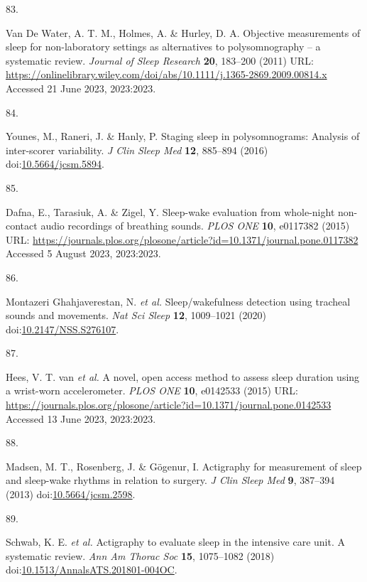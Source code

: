 \documentclass[
  9pt,
]{scrbook}
\newlength{\cslhangindent}
\newlength{\csllabelwidth}
\newlength{\cslentryspacingunit} %
\newenvironment{CSLReferences}[2] %
 {%
  \setlength{\parindent}{0pt}
  \ifodd #1
  \let\oldpar\par
  \def\par{\hangindent=\cslhangindent\oldpar}
  \fi
  \setlength{\parskip}{#2\cslentryspacingunit}
 }%
 {}
\newcommand{\CSLLeftMargin}[1]{\parbox[t]{\csllabelwidth}{#1}}
\newcommand{\CSLRightInline}[1]{\parbox[t]{\linewidth - \csllabelwidth}{#1}\break}
\begin{document}
\begin{CSLReferences}{0}{0}
\leavevmode{}%
\CSLLeftMargin{83. }%
\CSLRightInline{Van De Water, A. T. M., Holmes, A. \& Hurley, D. A.
Objective measurements of sleep for non-laboratory settings as
alternatives to polysomnography -- a systematic review. \emph{Journal of
Sleep Research} \textbf{20}, 183--200 (2011) URL:
\url{https://onlinelibrary.wiley.com/doi/abs/10.1111/j.1365-2869.2009.00814.x}
Accessed 21 June 2023, 2023:2023.}

\leavevmode{}%
\CSLLeftMargin{84. }%
\CSLRightInline{Younes, M., Raneri, J. \& Hanly, P. Staging sleep in
polysomnograms: Analysis of inter-scorer variability. \emph{J Clin Sleep
Med} \textbf{12}, 885--894 (2016)
doi:\href{https://doi.org/10.5664/jcsm.5894}{10.5664/jcsm.5894}.}

\leavevmode{}%
\CSLLeftMargin{85. }%
\CSLRightInline{Dafna, E., Tarasiuk, A. \& Zigel, Y. Sleep-wake
evaluation from whole-night non-contact audio recordings of breathing
sounds. \emph{{PLOS} {ONE}} \textbf{10}, e0117382 (2015) URL:
\url{https://journals.plos.org/plosone/article?id=10.1371/journal.pone.0117382}
Accessed 5 August 2023, 2023:2023.}

\leavevmode{}%
\CSLLeftMargin{86. }%
\CSLRightInline{Montazeri Ghahjaverestan, N. \emph{et al.}
Sleep/wakefulness detection using tracheal sounds and movements.
\emph{Nat Sci Sleep} \textbf{12}, 1009--1021 (2020)
doi:\href{https://doi.org/10.2147/NSS.S276107}{10.2147/NSS.S276107}.}

\leavevmode{}%
\CSLLeftMargin{87. }%
\CSLRightInline{Hees, V. T. van \emph{et al.} A novel, open access
method to assess sleep duration using a wrist-worn accelerometer.
\emph{{PLOS} {ONE}} \textbf{10}, e0142533 (2015) URL:
\url{https://journals.plos.org/plosone/article?id=10.1371/journal.pone.0142533}
Accessed 13 June 2023, 2023:2023.}

\leavevmode{}%
\CSLLeftMargin{88. }%
\CSLRightInline{Madsen, M. T., Rosenberg, J. \& Gögenur, I. Actigraphy
for measurement of sleep and sleep-wake rhythms in relation to surgery.
\emph{J Clin Sleep Med} \textbf{9}, 387--394 (2013)
doi:\href{https://doi.org/10.5664/jcsm.2598}{10.5664/jcsm.2598}.}

\leavevmode{}%
\CSLLeftMargin{89. }%
\CSLRightInline{Schwab, K. E. \emph{et al.} Actigraphy to evaluate sleep
in the intensive care unit. A systematic review. \emph{Ann Am Thorac
Soc} \textbf{15}, 1075--1082 (2018)
doi:\href{https://doi.org/10.1513/AnnalsATS.201801-004OC}{10.1513/AnnalsATS.201801-004OC}.}


\end{CSLReferences}
\end{document}
